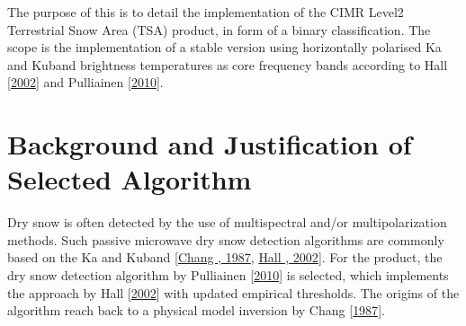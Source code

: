 \documentclass[letterpaper,10pt,english]{jupyterBook}
\begin{document}
\sphinxAtStartPar
The purpose of this {\hyperref[\detokenize{book/acronyms:term-ATBD}]{}} is to detail the implementation of the CIMR Level\sphinxhyphen{}2 Terrestrial Snow Area (TSA) product, in form of a binary classification.
The scope is the implementation of a stable version using horizontally polarised Ka and Ku\sphinxhyphen{}band brightness temperatures as core frequency bands according to Hall  {[}\hyperlink{cite.book/references:id2}{2002}{]} and Pulliainen  {[}\hyperlink{cite.book/references:id3}{2010}{]}.

\sphinxstepscope


\chapter{Background and Justification of Selected Algorithm}
\label{\detokenize{book/background_justification_algorithm:background-and-justification-of-selected-algorithm}}\label{\detokenize{book/background_justification_algorithm::doc}}
\sphinxAtStartPar
Dry snow is often detected by the use of multi\sphinxhyphen{}spectral and/or multi\sphinxhyphen{}polarization methods.
Such passive microwave dry snow detection algorithms are commonly based on the Ka and Ku\sphinxhyphen{}band {[}\hyperlink{cite.book/references:id7}{Chang , 1987}, \hyperlink{cite.book/references:id2}{Hall , 2002}{]}.
For the {\hyperref[\detokenize{book/acronyms:term-TSA}]{}} product, the dry snow detection algorithm by Pulliainen  {[}\hyperlink{cite.book/references:id3}{2010}{]} is selected, which implements the approach by Hall  {[}\hyperlink{cite.book/references:id2}{2002}{]} with updated empirical thresholds.
The origins of the algorithm reach back to a physical model inversion by Chang  {[}\hyperlink{cite.book/references:id7}{1987}{]}.
\end{document}
